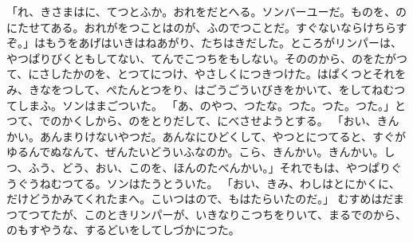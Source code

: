 \documentclass[a4paper,
tate,
book]
{jlreq}
\begin{document}
「れ、きさまはに、てつとふか。おれをだとへる。ソンバーユーだ。ものを、のにたせてある。おれがをつことはのが、ふのでつことだ。すぐないならけちらすぞ。」はもうをあげはいきはねあがり、たちはきだした。ところがリンパーは、やつぱりびくともしてない、てんでこつちをもしない。そののから、のをたがつて、にさしたかのを、とつてにつけ、やさしくにつきつけた。はぱくつとそれをみ、きなをつして、ぺたんとつをり、はごうごういびきをかいて、をしてねむつてしまふ。ソンはまごついた。
「あ、のやつ、つたな。つた。つた。つた。」とつて、でのかくしから、のをとりだして、にべさせようとする。
「おい、きんかい。あんまりけないやつだ。あんなにひどくして、やつとにつてると、すぐがゆるんでぬなんて、ぜんたいどういふなのか。こら、きんかい。きんかい。しつ、ふう、どう、おい、このを、ほんのたべんかい。」それでもは、やつぱりぐうぐうねむつてる。ソンはたうとういた。
「おい、きみ、わしはとにかくに、だけどうかみてくれたまへ。こいつはので、もはたらいたのだ。」
  むすめはだまつてつてたが、このときリンパーが、いきなりこつちをりいて、まるでのから、のもすやうな、するどいをしてしづかにつた。
\end{document}
